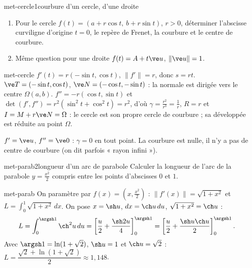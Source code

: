 \begin{exo}{met-cercle}{1}{courbure d'un cercle, d'une droite}
\begin{enumerate}
\item Pour le cercle $f(t)=(a+r\cos t,\ b+r\sin t)$, $r>0$, déterminer l'abscisse curviligne d'origine $t=0$, le repère de Frenet, la courbure et le centre de courbure.
\item Même question pour une droite $f(t)=A+t\ve u$, $\|\ve u\|=1$.
\end{enumerate}
\end{exo}

\begin{corrige}{met-cercle}
 $f'(t)=r(-\sin t,\cos t)$, $\|f'\|=r$, donc $s=rt$. $\ve T=(-\sin t,\cos t)$, $\ve N=(-\cos t,-\sin t)$ : la normale est dirigée vers le centre $\Omega(a,b)$. $f''=-r(\cos t,\sin t)$ et $\det(f',f'')=r^2(\sin^2t+\cos^2t)=r^2$, d'où $\gamma=\frac{r^2}{r^3}=\frac1r$, $R=r$ et $I=M+r\ve N=\Omega$ : le cercle est son propre cercle de courbure ; sa développée est réduite au point $\Omega$.

 $f'=\ve u$, $f''=\ve0$ : $\gamma=0$ en tout point. La courbure est nulle, il n'y a pas de centre de courbure (on dit parfois « rayon infini »).
\end{corrige}

\begin{exo}{met-parab}{2}{longueur d'un arc de parabole}
Calculer la longueur de l'arc de la parabole $y=\frac{x^2}2$ compris entre les points d'abscisses $0$ et $1$.
\end{exo}

\begin{corrige}{met-parab}
On paramètre par $f(x)=\left(x,\frac{x^2}2\right)$ : $\|f'(x)\|=\sqrt{1+x^2}$ et $L=\int_0^1\sqrt{1+x^2}\,dx$.
On pose $x=\sh u$, $dx=\ch u\,du$, $\sqrt{1+x^2}=\ch u$ :
\[L=\int_0^{\argsh1}\ch^2u\,du=\left[\frac u2+\frac{\sh2u}4\right]_0^{\argsh1}=\left[\frac u2+\frac{\sh u\ch u}2\right]_0^{\argsh1}.\]
Avec $\argsh1=\ln(1+\sqrt2)$, $\sh u=1$ et $\ch u=\sqrt2$ : $L=\dfrac{\sqrt2+\ln(1+\sqrt2)}2\approx1{,}148$.
\end{corrige}

